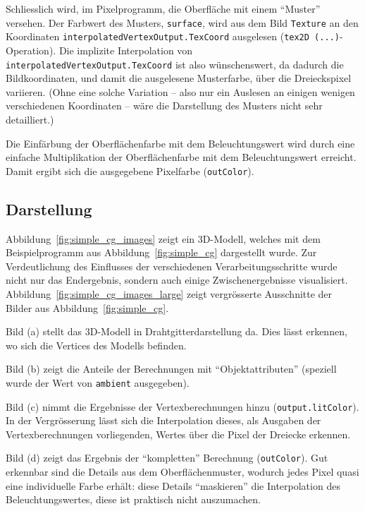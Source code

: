 \documentclass[twoside,a4paper,fleqn,12pt]{book}
\begin{document}
Schliesslich wird, im Pixelprogramm, die Oberfläche mit einem "`Muster"' versehen. Der Farbwert des Musters, \verb+surface+, wird aus dem Bild \verb+Texture+
an den Koordinaten \verb+interpolatedVertexOutput.TexCoord+ ausgelesen (\verb+tex2D (...)+-Operation).
Die implizite Interpolation von \verb+interpolatedVertexOutput.TexCoord+ ist also wünschenswert, da dadurch die Bildkoordinaten,
und damit die ausgelesene Musterfarbe, über die Dreieckspixel variieren. (Ohne eine solche Variation -- also nur ein Auslesen an einigen wenigen verschiedenen Koordinaten --
wäre die Darstellung des Musters nicht sehr detailliert.)

Die Einfärbung der Oberflächenfarbe mit dem Beleuchtungswert wird durch eine einfache Multiplikation der Oberflächenfarbe mit
dem Beleuchtungswert erreicht. Damit ergibt sich die ausgegebene Pixelfarbe (\verb+outColor+).

\subsection{Darstellung}

Abbildung~\ref{fig:simple_cg_images} zeigt ein 3D-Modell, welches mit dem Beispielprogramm aus Abbildung~\ref{fig:simple_cg} dargestellt wurde.
Zur Verdeutlichung des Einflusses der verschiedenen Verarbeitungsschritte wurde nicht nur das Endergebnis, sondern auch einige Zwischenergebnisse
visualisiert. Abbildung~\ref{fig:simple_cg_images_large} zeigt vergrösserte Ausschnitte der Bilder aus Abbildung~\ref{fig:simple_cg}.

Bild (a) stellt das 3D-Modell in Drahtgitterdarstellung da. Dies lässt erkennen, wo sich die Vertices des Modells befinden.

Bild (b) zeigt die Anteile der Berechnungen mit  "`Objektattributen"' (speziell wurde der Wert von \verb+ambient+ ausgegeben).

Bild (c) nimmt die Ergebnisse der Vertexberechnungen hinzu (\verb+output.litColor+). In der Vergrösserung lässt sich die Interpolation
dieses, als Ausgaben der Vertexberechnungen vorliegenden, Wertes über die Pixel der Dreiecke erkennen.

Bild (d) zeigt das Ergebnis der "`kompletten"' Berechnung (\verb+outColor+). Gut erkennbar sind die Details aus dem Oberflächenmuster,
wodurch jedes Pixel quasi eine individuelle Farbe erhält: diese Details "`maskieren"' die Interpolation des Beleuchtungswertes, diese ist
praktisch nicht auszumachen.
\end{document}
